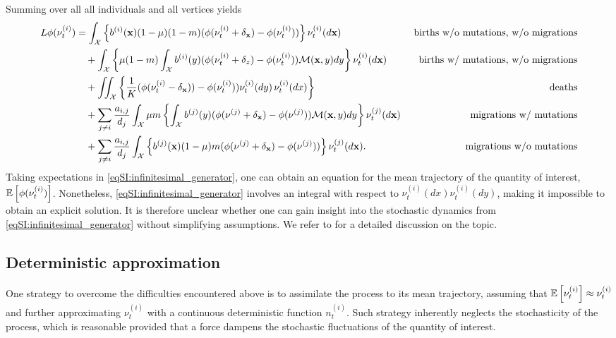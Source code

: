     Summing over all all individuals and all vertices yields
    \small
    \begin{align} \label{eqSI:infinitesimal_generator}
        L\phi(\nu^{(i)}_t) &= \int_\mathcal{X} \left\{ b^{(i)}({\textbf x}) (1 - \mu ) (1 - m)( \phi(\nu^{(i)}_t + \delta_{{\textbf x}}) - \phi(\nu^{(i)}_t))\right\} \nu^{(i)}_t(d{\textbf x}) &\text{ births w/o mutations, w/o migrations} \nonumber\\
        &\quad + \int_\mathcal{X}  \left\{\mu (1-m) \int_\mathcal{X} b^{(i)}(y) (\phi(\nu^{(i)}_t + \delta_z) - \phi(\nu^{(i)}_t))\mathcal{M}({\textbf x},y) dy \right\} \nu^{(i)}_t(d{\textbf x})  &\text{ births w/ mutations, w/o migrations} \nonumber\\
        &\quad + \iint_\mathcal{X} \left\{ \frac{1}{K}(\phi(\nu^{(i)}_t - \delta_{{\textbf x}})) - \phi(\nu^{(i)}_t))\nu^{(i)}_t(d y) \, \nu^{(i)}_t(dx)  \right\} &\text{ deaths} \nonumber\\
        &\quad + \sum_{j \neq i } \frac{a_{i,j}}{d_j} \int_\mathcal{X}  \mu m \left\{ \int_\mathcal{X} b^{(j)}(y) (\phi(\nu^{(j)} +  \delta_{\textbf x}) - \phi(\nu^{(j)}))\mathcal{M}({\textbf x}, y)dy \right\} \nu^{(j)}_t(d{\textbf x})  &\text{ migrations w/ mutations} \nonumber\\
        &\quad + \sum_{j\neq i}\frac{a_{i,j}}{d_j} \int_\mathcal{X} \left\{ b^{(j)}({\textbf x}) (1 - \mu ) m ( \phi(\nu^{(j)} + \delta_{{\textbf x}}) - \phi(\nu^{(j)})) \right\} \nu^{(j)}_t(d{\textbf x}). &\text{ migrations w/o mutations} 
    \end{align}
    \normalsize
    Taking expectations in \cref{eqSI:infinitesimal_generator}, one can obtain an equation for the mean trajectory of the quantity of interest, $ {\mathbb{E}} \left[ \phi(\nu^{(i)}_t) \right]$. Nonetheless, \cref{eqSI:infinitesimal_generator} involves an integral with respect to $\nu^{(i)}_t(dx) \nu^{(i)}_t(dy)$, making it impossible to obtain an explicit solution. It is therefore unclear whether one can gain insight into the stochastic dynamics from \cref{eqSI:infinitesimal_generator} without simplifying assumptions. We refer to \cite{Champagnat2006} for a detailed discussion on the topic.
    
    \subsection{Deterministic approximation} 
    One strategy to overcome the difficulties encountered above is to assimilate the process to its mean trajectory, assuming that ${\mathbb{E}} \left[ \nu^{(i)}_t \right] \approx \nu^{(i)}_t$ and further approximating $\nu^{(i)}_t$ with a continuous deterministic function $n_t^{(i)}$. Such strategy inherently neglects the stochasticity of the process, which is reasonable provided that a force dampens the stochastic fluctuations of the quantity of interest.
    
